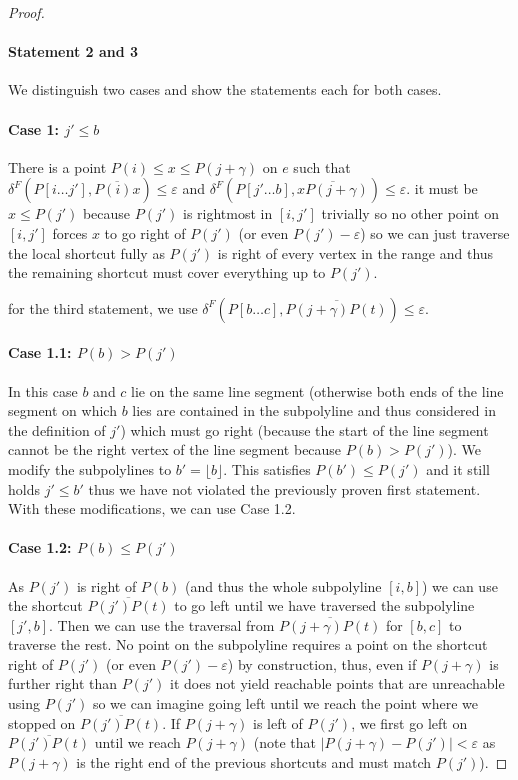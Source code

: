 \begin{proof}
	\paragraph{Statement 2 and 3}
	We distinguish two cases and show the statements each for both cases. 
	
	\paragraph{Case 1: \(j' \leq b\)}
	There is a point \(P(i) \leq x \leq P(j + \gamma)\) on \(e\) such that \(\delta^F(P[i \dots j'], \overline{P(i)x}) \leq \varepsilon\) and \(\delta^F(P[j' \dots b], \overline{xP(j+\gamma)}) \leq \varepsilon\). it must be \(x \leq P(j')\) because \(P(j')\) is rightmost in \([i, j']\) trivially so no other point on \([i, j']\) forces \(x\) to go right of \(P(j')\) (or even \(P(j') - \varepsilon\)) so we can just traverse the local shortcut fully as \(P(j')\) is right of every vertex in the range and thus the remaining shortcut must cover everything up to \(P(j')\). 

	for the third statement, we use \(\delta^F(P[b\dots c], \overline{P(j+\gamma)P(t)}) \leq \varepsilon\). 

	\paragraph{Case 1.1: \(P(b) > P(j')\)} 
	In this case \(b\) and \(c\) lie on the same line segment (otherwise both ends of the line segment on which \(b\) lies are contained in the subpolyline and thus considered in the definition of \(j'\)) which must go right (because the start of the line segment cannot be the right vertex of the line segment because \(P(b) > P(j')\)). We modify the subpolylines to \(b' = \lfloor b \rfloor\). This satisfies \(P(b') \leq P(j')\) and it still holds \(j' \leq b'\) thus we have not violated the previously proven first statement. With these modifications, we can use Case 1.2.

	\paragraph{Case 1.2: \(P(b) \leq P(j')\)} 
	As \(P(j')\) is right of \(P(b)\) (and thus the whole subpolyline \([i, b]\)) we can use the shortcut \(\overline{P(j')P(t)}\) to go left until we have traversed the subpolyline \([j', b]\). Then we can use the traversal from \(\overline{P(j+\gamma)P(t)}\) for \([b, c]\) to traverse the rest. No point on the subpolyline requires a point on the shortcut right of \(P(j')\) (or even \(P(j') - \varepsilon\)) by construction, thus, even if \(P(j + \gamma)\) is further right than \(P(j')\) it does not yield reachable points that are unreachable using \(P(j')\) so we can imagine going left until we reach the point where we stopped on \(\overline{P(j')P(t)}\). If \(P(j+\gamma)\) is left of \(P(j')\), we first go left on \(\overline{P(j')P(t)}\) until we reach \(P(j+\gamma)\) (note that \(|P(j+\gamma) - P(j')| < \varepsilon\) as \(P(j+\gamma)\) is the right end of the previous shortcuts and must match \(P(j')\)).


\end{proof}
